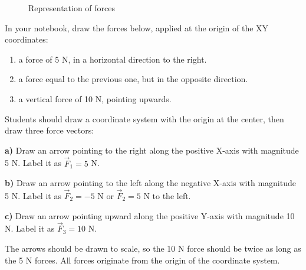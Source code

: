 \begin{figure}[H]
    \centering
    \caption{Representation of forces}
    \label{fig:representacion_fuerzas}
\end{figure}

\begin{exercise}
    In your notebook, draw the forces below, applied at the origin of the XY coordinates:
    \begin{enumerate}[label=\letraminuscula]
        \item a force of 5 N, in a horizontal direction to the right.
        \item a force equal to the previous one, but in the
        opposite direction.
        \item a vertical force of 10 N, pointing upwards.
    \end{enumerate}
    \begin{solu}
        Students should draw a coordinate system with the origin at the center, then draw three force vectors:

        \textbf{a)} Draw an arrow pointing to the right along the positive X-axis with magnitude 5 N. Label it as $\vec{F}_1 = 5$ N.

        \textbf{b)} Draw an arrow pointing to the left along the negative X-axis with magnitude 5 N. Label it as $\vec{F}_2 = -5$ N or $\vec{F}_2 = 5$ N to the left.

        \textbf{c)} Draw an arrow pointing upward along the positive Y-axis with magnitude 10 N. Label it as $\vec{F}_3 = 10$ N.

        The arrows should be drawn to scale, so the 10 N force should be twice as long as the 5 N forces. All forces originate from the origin of the coordinate system.
    \end{solu}
\end{exercise}

